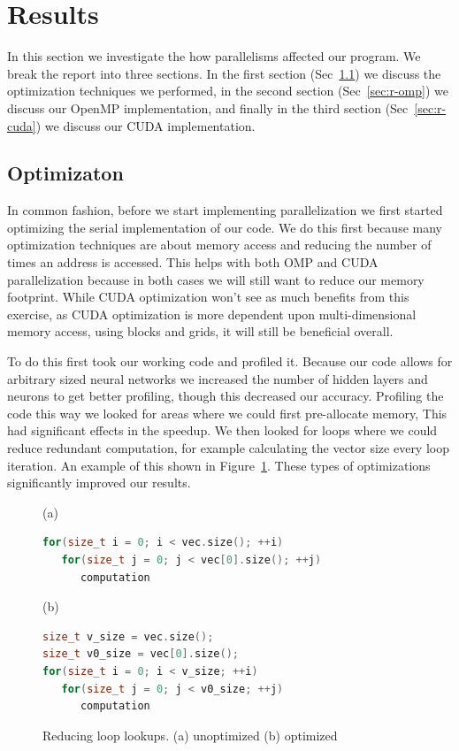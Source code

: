 \section{Results}\label{sec:results}
In this section we investigate the how parallelisms affected our program. We
break the report into three sections. In the first section (Sec~\ref{sec:r-opt})
we discuss the optimization techniques we performed, in the second
section (Sec~\ref{sec:r-omp}) we discuss our OpenMP implementation, and finally
in the third section (Sec~\ref{sec:r-cuda}) we discuss our CUDA implementation. 

\subsection{Optimizaton}\label{sec:r-opt}
In common fashion, before we start implementing parallelization we first started
optimizing the serial implementation of our code. We do this first because many
optimization techniques are about memory access and reducing the number of times
an address is accessed. This helps with both OMP and CUDA parallelization
because in both cases we will still want to reduce our memory footprint. While
CUDA optimization won't see as much benefits from this exercise, as CUDA
optimization is more dependent upon multi-dimensional memory access, using
blocks and grids, it will still be beneficial overall. 

To do this first took our working code and profiled it. Because our code allows
for arbitrary sized neural networks we increased the number of hidden layers and
neurons to get better profiling, though this decreased our accuracy. 
Profiling the code this way we looked for areas where we could
first pre-allocate memory, This had significant effects in the speedup. We then
looked for loops where we could reduce redundant computation, for example
calculating the vector size every loop iteration. An example of this shown in 
Figure~\ref{fig:opt}. These types of optimizations significantly improved our
results. 

\begin{figure}[ht]
(a)
\begin{lstlisting}[language=C++,
                   directivestyle={\color{black}},
                   emph={size_t},
                   emphstyle={\color{blue}}]
for(size_t i = 0; i < vec.size(); ++i)
   for(size_t j = 0; j < vec[0].size(); ++j)
      computation
\end{lstlisting}
(b)
\begin{lstlisting}[language=C++,
                   directivestyle={\color{black}},
                   emph={size_t},
                   emphstyle={\color{blue}}]
size_t v_size = vec.size();
size_t v0_size = vec[0].size();
for(size_t i = 0; i < v_size; ++i)
   for(size_t j = 0; j < v0_size; ++j)
      computation
\end{lstlisting}
\caption{Reducing loop lookups. (a) unoptimized (b) optimized}
\label{fig:opt}
\end{figure}

